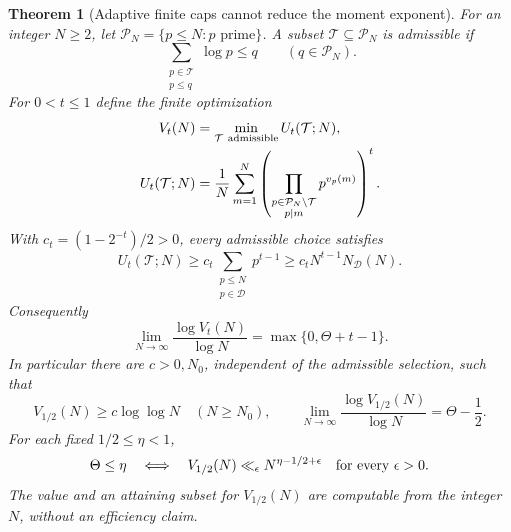 \documentclass[11pt]{article}
\newtheorem{theorem}{Theorem}[section]
\theoremstyle{definition}
\begin{document}
\begin{theorem}[Adaptive finite caps cannot reduce the moment exponent]
\label{thm:adaptive-capped-moment-exponent}
For an integer $N\ge2$, let
$\mathcal P_N=\{p\le N:p\text{ prime}\}$.
A subset $\mathcal T\subseteq\mathcal P_N$ is admissible if
\[
       \sum_{\substack{p\in\mathcal T\\p\le q}}\log p\le q
                            \qquad(q\in\mathcal P_N).
\]
For $0<t\le1$ define the finite optimization
\begin{equation}
 \begin{aligned}
 V_t(N)&=\min_{\mathcal T\ {\rm admissible}} U_t(\mathcal T;N),\\
 U_t(\mathcal T;N)
   &=\frac1N\sum_{m=1}^N
       \left(\prod_{\substack{p\in\mathcal P_N\setminus\mathcal T\\p\mid m}}
                         p^{v_p(m)}\right)^t .
 \end{aligned}
 \label{eq:adaptive-capped-moment-definition}
\end{equation}
With $c_t=(1-2^{-t})/2>0$, every admissible choice satisfies
\begin{equation}
 U_t(\mathcal T;N)\ge
 c_t\sum_{\substack{p\le N\\p\in\mathcal D}}p^{t-1}
 \ge c_t N^{t-1}N_{\mathcal D}(N).
 \label{eq:adaptive-capped-uniform-moment-floor}
\end{equation}
Consequently
\begin{equation}
 \lim_{N\to\infty}\frac{\log V_t(N)}{\log N}
                          =\max\{0,\Theta+t-1\}.
 \label{eq:adaptive-capped-moment-exponent}
\end{equation}
In particular there are $c>0,N_0$, independent of the admissible
selection, such that
\begin{equation}
 V_{1/2}(N)\ge c\log\log N\quad(N\ge N_0),\qquad
 \lim_{N\to\infty}\frac{\log V_{1/2}(N)}{\log N}
                                      =\Theta-\frac12 .
 \label{eq:adaptive-capped-critical-floor}
\end{equation}
For each fixed $1/2\le\eta<1$,
\begin{equation}
 \Theta\le\eta
 \quad\Longleftrightarrow\quad
 V_{1/2}(N)\ll_\epsilon N^{\eta-1/2+\epsilon}
                           \quad\hbox{for every }\epsilon>0.
 \label{eq:adaptive-capped-moment-strip}
\end{equation}
The value and an attaining subset for $V_{1/2}(N)$ are computable
from the integer $N$, without an efficiency claim.
\end{theorem}
\end{document}
